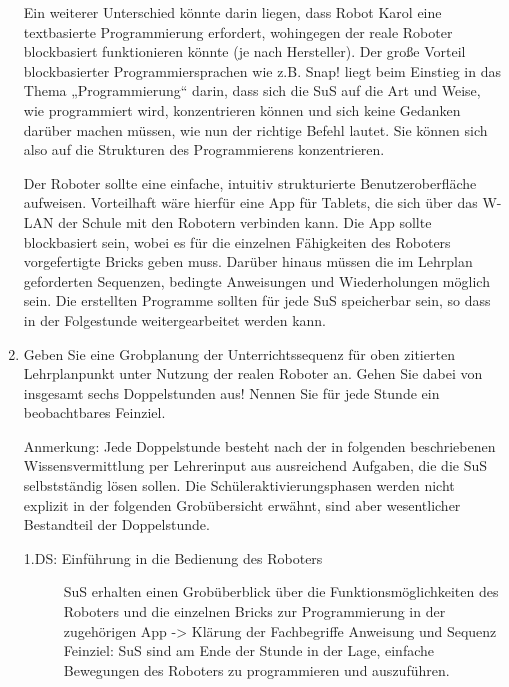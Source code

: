 \documentclass{lehramt-informatik-aufgabe}
\begin{document}
\begin{enumerate}
\begin{liAntwort}
Ein weiterer Unterschied könnte darin liegen, dass Robot Karol eine
textbasierte Programmierung erfordert, wohingegen der reale Roboter
blockbasiert funktionieren könnte (je nach Hersteller). Der große
Vorteil blockbasierter Programmiersprachen wie z.B. Snap! liegt beim
Einstieg in das Thema „Programmierung“ darin, dass sich die SuS auf die
Art und Weise, wie programmiert wird, konzentrieren können und sich
keine Gedanken darüber machen müssen, wie nun der richtige Befehl
lautet. Sie können sich also auf die Strukturen des Programmierens
konzentrieren.


Der Roboter sollte eine einfache, intuitiv strukturierte
Benutzeroberfläche aufweisen. Vorteilhaft wäre hierfür eine App für
Tablets, die sich über das W-LAN der Schule mit den Robotern verbinden
kann. Die App sollte blockbasiert sein, wobei es für die einzelnen
Fähigkeiten des Roboters vorgefertigte Bricks geben muss. Darüber hinaus
müssen die im Lehrplan geforderten Sequenzen, bedingte Anweisungen und
Wiederholungen möglich sein. Die erstellten Programme sollten für jede
SuS speicherbar sein, so dass in der Folgestunde weitergearbeitet werden
kann.
\end{liAntwort}


\item Geben Sie eine Grobplanung der Unterrichtssequenz für oben
zitierten Lehrplanpunkt unter Nutzung der realen Roboter an. Gehen Sie
dabei von insgesamt sechs Doppelstunden aus! Nennen Sie für jede Stunde
ein beobachtbares Feinziel.

\begin{liAntwort}
Anmerkung: Jede Doppelstunde besteht nach der in folgenden beschriebenen Wissensvermittlung per Lehrerinput aus ausreichend Aufgaben, die die SuS selbstständig lösen sollen. Die Schüleraktivierungsphasen werden nicht explizit in der folgenden Grobübersicht erwähnt, sind aber wesentlicher Bestandteil der Doppelstunde.

\begin{description}
\item[1.DS: Einführung in die Bedienung des Roboters]

SuS erhalten einen Grobüberblick über die Funktionsmöglichkeiten des
Roboters und die einzelnen Bricks zur Programmierung in der zugehörigen
App -> Klärung der Fachbegriffe Anweisung und Sequenz Feinziel: SuS sind
am Ende der Stunde in der Lage, einfache Bewegungen des Roboters zu
programmieren und auszuführen.


\end{description}
\end{liAntwort}
\end{enumerate}
\end{document}
